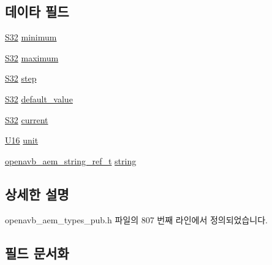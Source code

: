 \subsection*{데이타 필드}
\begin{DoxyCompactItemize}
\item 
\hyperlink{openavb__types__base__pub_8h_a39c786017723555afb9e8b85accec0de}{S32} \hyperlink{structopenavb__aem__control__value__format__control__linear__int32__t_a984cfb53af675a4030eba2f36595c638}{minimum}
\item 
\hyperlink{openavb__types__base__pub_8h_a39c786017723555afb9e8b85accec0de}{S32} \hyperlink{structopenavb__aem__control__value__format__control__linear__int32__t_a6dcd304ce638783ff3f5ea638e00cd33}{maximum}
\item 
\hyperlink{openavb__types__base__pub_8h_a39c786017723555afb9e8b85accec0de}{S32} \hyperlink{structopenavb__aem__control__value__format__control__linear__int32__t_a10f40e3d2e0b2ab1fea8b3eca9a31b66}{step}
\item 
\hyperlink{openavb__types__base__pub_8h_a39c786017723555afb9e8b85accec0de}{S32} \hyperlink{structopenavb__aem__control__value__format__control__linear__int32__t_af38b943b48fb2c887636a1ac8ae1ef88}{default\+\_\+value}
\item 
\hyperlink{openavb__types__base__pub_8h_a39c786017723555afb9e8b85accec0de}{S32} \hyperlink{structopenavb__aem__control__value__format__control__linear__int32__t_a4a9be252bd980d22cae9a4b8b30163bb}{current}
\item 
\hyperlink{openavb__types__base__pub_8h_a0a0a322d5fa4a546d293a77ba8b4a71f}{U16} \hyperlink{structopenavb__aem__control__value__format__control__linear__int32__t_a0b3ff376c10369016824076deacc055e}{unit}
\item 
\hyperlink{structopenavb__aem__string__ref__t}{openavb\+\_\+aem\+\_\+string\+\_\+ref\+\_\+t} \hyperlink{structopenavb__aem__control__value__format__control__linear__int32__t_a1f81001cefa769cb3651172fd5ab0748}{string}
\end{DoxyCompactItemize}


\subsection{상세한 설명}


openavb\+\_\+aem\+\_\+types\+\_\+pub.\+h 파일의 807 번째 라인에서 정의되었습니다.



\subsection{필드 문서화}
